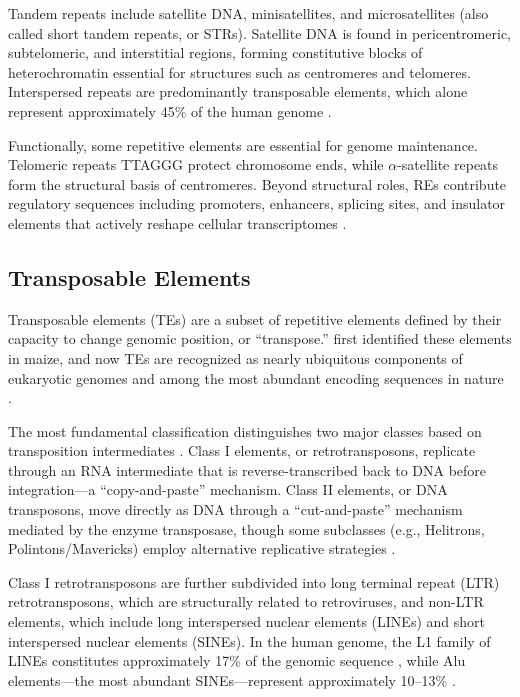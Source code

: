 Tandem repeats include satellite DNA, minisatellites, and microsatellites (also called short tandem repeats, or STRs). Satellite DNA is found in pericentromeric, subtelomeric, and interstitial regions, forming constitutive blocks of heterochromatin essential for structures such as centromeres and telomeres. Interspersed repeats are predominantly transposable elements, which alone represent approximately 45\% of the human genome \parencite{ruizruano2023}.

Functionally, some repetitive elements are essential for genome maintenance. Telomeric repeats TTAGGG protect chromosome ends, while $\alpha$-satellite repeats form the structural basis of centromeres. Beyond structural roles, REs contribute regulatory sequences including promoters, enhancers, splicing sites, and insulator elements that actively reshape cellular transcriptomes \parencite{rebollo2012,chuong2017,lu2020}.

\subsection{Transposable Elements}

Transposable elements (TEs) are a subset of repetitive elements defined by their capacity to change genomic position, or ``transpose.'' \textcite{mcclintock1950} first identified these elements in maize, and now TEs are recognized as nearly ubiquitous components of eukaryotic genomes and among the most abundant encoding sequences in nature \parencite{hayward2022,wells2020}.

The most fundamental classification distinguishes two major classes based on transposition intermediates \parencite{wicker2007}. Class I elements, or retrotransposons, replicate through an RNA intermediate that is reverse-transcribed back to DNA before integration---a ``copy-and-paste'' mechanism. Class II elements, or DNA transposons, move directly as DNA through a ``cut-and-paste'' mechanism mediated by the enzyme transposase, though some subclasses (e.g., Helitrons, Polintons/Mavericks) employ alternative replicative strategies \parencite{kapitonov2006,feschotte2007}.

Class I retrotransposons are further subdivided into long terminal repeat (LTR) retrotransposons, which are structurally related to retroviruses, and non-LTR elements, which include long interspersed nuclear elements (LINEs) and short interspersed nuclear elements (SINEs). In the human genome, the L1 family of LINEs constitutes approximately 17\% of the genomic sequence \parencite{finnegan1989}, while Alu elements---the most abundant SINEs---represent approximately 10--13\% \parencite{batzer2002,dewannieux2003}.

